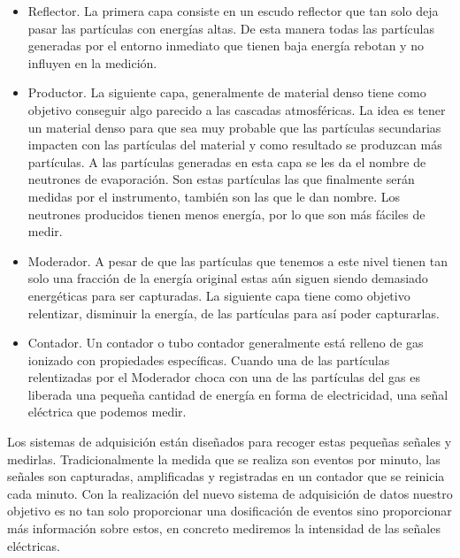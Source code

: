 	\begin{itemize}
		\item   Reflector. La primera capa consiste en un escudo reflector que tan solo deja pasar las partículas con energías altas. De 
			esta manera todas las partículas generadas por el entorno inmediato que tienen baja energía rebotan y no influyen en la
			medición. 
		\item   Productor. La siguiente capa, generalmente de material denso tiene como objetivo conseguir algo parecido a las cascadas 
			atmosféricas. La idea es tener un material denso para que sea muy probable que las partículas secundarias impacten con las
			partículas del material y como resultado se produzcan más partículas. A las partículas generadas en esta capa se les da el
			nombre de neutrones de evaporación. Son estas partículas las que finalmente serán medidas por el instrumento, también son las
			que le dan nombre. Los neutrones producidos tienen menos energía, por lo que son más fáciles de medir. 
		\item   Moderador. A pesar de que las partículas que tenemos a este nivel tienen tan solo una fracción de la energía original estas
		        aún siguen siendo demasiado energéticas para ser capturadas. La siguiente capa tiene como objetivo relentizar, disminuir 
			la energía, de las partículas para así poder capturarlas.
		\item   Contador. Un contador o tubo contador generalmente está relleno de gas ionizado con propiedades específicas. Cuando una de 
		  	las partículas relentizadas por el Moderador choca con una de las partículas del gas es liberada una pequeña cantidad de
			energía en forma de electricidad, una señal eléctrica que podemos medir.
      	\end{itemize}
	Los sistemas de adquisición están diseñados para recoger estas pequeñas señales y medirlas. Tradicionalmente la medida que se realiza son 
	eventos por minuto, las señales son capturadas, amplificadas y registradas en un contador que se reinicia cada minuto. Con la realización
	del nuevo sistema de adquisición de datos nuestro objetivo es no tan solo proporcionar una dosificación de eventos sino proporcionar más 
	información sobre estos, en concreto mediremos la intensidad de las señales eléctricas. 


